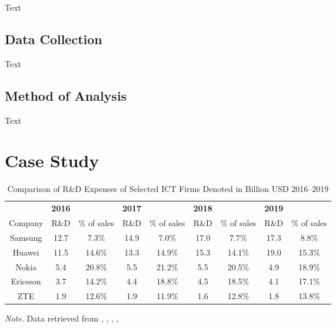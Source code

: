 \documentclass[11pt,a4paper,oneside]{report}
\begin{document}
Text



\section{Data Collection}
\label{section_data_collection}

Text

\section{Method of Analysis}

Text

\newpage


\chapter{Case Study}

\begin{table}[htb]
	\caption{Comparison of R\&D Expenses of Selected ICT Firms Denoted in Billion USD 2016–2019}
	\begin{tabular}{ccccccccc}
	\hline
			&	\textbf{2016}	&	&	\textbf{2017}	&				& \textbf{2018}		&				& \textbf{2019}		&				\\
	Company	&	R\&D	&	\% of sales	& R\&D	&	\% of sales	&	R\&D	&	\% of sales	&	R\&D	&	\% of sales	\\
	\hline
	Samsung	& 12.7	&	7.3\%	& 14.9		& 7.0\%			&	17.0	& 7.7\%	& 17.3	& 8.8\% \\
	
	Huawei	& 11.5	& 14.6\%	& 13.3		&	14.9\%		& 15.3		&	14.1\%		& 19.0		& 15.3\% \\
	Nokia	& 5.4	& 20.8\%	& 5.5		& 21.2\%		& 5.5		& 20.5\%		& 4.9		& 18.9\% \\
	Ericsson	& 3.7	& 14.2\%	& 4.4	&	18.8\%		& 4.5		& 18.5\%	& 4.1			& 17.1\% \\	
	ZTE		& 1.9	& 12.6\%	&	1.9		& 11.9\%		& 1.6		& 12.8\%		& 1.8 	& 13.8\% \\
	\hline
	\end{tabular}
	\textit{Note.} Data retrieved from , , , ,  
		\label{tab:RnD_Comparison}
\end{table}
\end{document}
